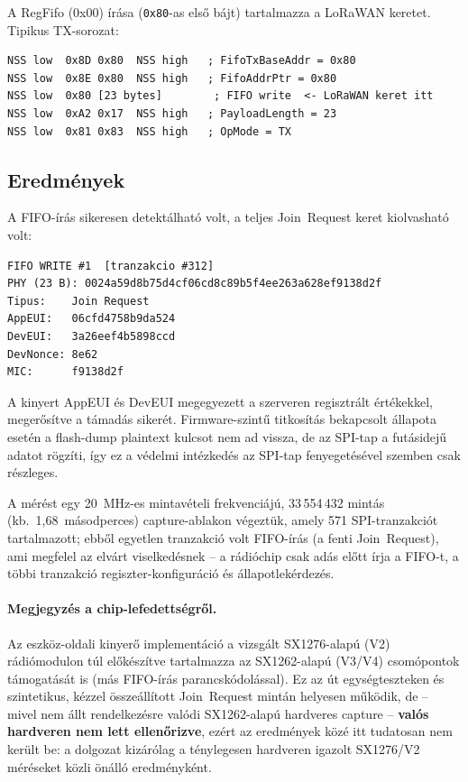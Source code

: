 \documentclass[12pt,a4paper]{article}
\begin{document}
A RegFifo (0x00) írása (\texttt{0x80}-as első bájt) tartalmazza a
LoRaWAN keretet. Tipikus TX-sorozat:
\needspace{6cm}
\begin{lstlisting}[language={},caption={SPI TX sorozat -- Join Request adás előtt}]
NSS low  0x8D 0x80  NSS high   ; FifoTxBaseAddr = 0x80
NSS low  0x8E 0x80  NSS high   ; FifoAddrPtr = 0x80
NSS low  0x80 [23 bytes]        ; FIFO write  <- LoRaWAN keret itt
NSS low  0xA2 0x17  NSS high   ; PayloadLength = 23
NSS low  0x81 0x83  NSS high   ; OpMode = TX
\end{lstlisting}

\subsection{Eredmények}

A FIFO-írás sikeresen detektálható volt, a teljes Join~Request keret
kiolvasható volt:

\needspace{7cm}
\begin{lstlisting}[caption={SPI-busz tap eredménye}]
FIFO WRITE #1  [tranzakcio #312]
PHY (23 B): 0024a59d8b75d4cf06cd8c89b5f4ee263a628ef9138d2f
Tipus:    Join Request
AppEUI:   06cfd4758b9da524
DevEUI:   3a26eef4b5898ccd
DevNonce: 8e62
MIC:      f9138d2f
\end{lstlisting}

A kinyert AppEUI és DevEUI megegyezett a szerveren regisztrált értékekkel,
megerősítve a támadás sikerét. Firmware-szintű titkosítás bekapcsolt állapota esetén
a flash-dump plaintext kulcsot nem ad vissza, de az SPI-tap a futásidejű
adatot rögzíti, így ez a védelmi intézkedés az SPI-tap fenyegetésével szemben
csak részleges.

A mérést egy 20~MHz-es mintavételi frekvenciájú, 33\,554\,432 mintás
(kb.\ 1{,}68~másodperces) capture-ablakon végeztük, amely 571 SPI-tranzakciót
tartalmazott; ebből egyetlen tranzakció volt FIFO-írás (a fenti Join~Request),
ami megfelel az elvárt viselkedésnek -- a rádióchip csak adás előtt írja a
FIFO-t, a többi tranzakció regiszter-konfiguráció és állapotlekérdezés.

\paragraph{Megjegyzés a chip-lefedettségről.} Az eszköz-oldali kinyerő
implementáció a vizsgált SX1276-alapú (V2) rádiómodulon túl előkészítve
tartalmazza az SX1262-alapú (V3/V4) csomópontok támogatását is (más
FIFO-írás parancskódolással). Ez az út egységteszteken és szintetikus,
kézzel összeállított Join~Request mintán helyesen működik, de -- mivel nem
állt rendelkezésre valódi SX1262-alapú hardveres capture -- \textbf{valós
hardveren nem lett ellenőrizve}, ezért az eredmények közé itt tudatosan nem
került be: a dolgozat kizárólag a ténylegesen hardveren igazolt SX1276/V2
méréseket közli önálló eredményként.
\end{document}
